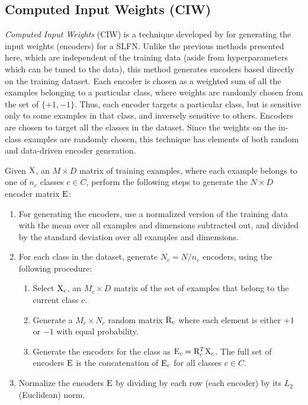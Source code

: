 \subsection{Computed Input Weights (CIW)}

\emph{Computed Input Weights} (CIW) is a technique developed by \textcite{Tapson2015}
for generating the input weights (encoders) for a SLFN.
Unlike the previous methods presented here,
which are independent of the training data
(aside from hyperparameters which can be tuned to the data),
this method generates encoders based directly on the training dataset.
Each encoder is chosen as a weighted sum of all the examples
belonging to a particular class,
where weights are randomly chosen from the set of $\{+1, -1\}$.
Thus, each encoder targets a particular class,
but is sensitive only to some examples in that class,
and inversely sensitive to others.
Encoders are chosen to target all the classes in the dataset.
Since the weights on the in-class examples are randomly chosen,
this technique has elements of both random and data-driven encoder generation.

Given $\mathrm{X}$, an $M \times D$ matrix of training examples,
where each example belongs to one of $n_c$ classes $c \in C$,
perform the following steps to generate the $N \times D$ encoder matrix $\mathrm{E}$:
\begin{enumerate}
  \item For generating the encoders,
    use a normalized version of the training data
    with the mean over all examples and dimensions subtracted out,
    and divided by the standard deviation over all examples and dimensions.
  \item For each class in the dataset, generate $N_c = N / n_c$ encoders,
    using the following procedure:
    \begin{enumerate}
      \item Select $\mathrm{X}_c$, an $M_c \times D$ matrix of the set of examples
        that belong to the current class $c$.
      \item Generate a $M_c \times N_c$ random matrix $\mathrm{R}_c$
        where each element is either $+1$ or $-1$ with equal probability.
      \item Generate the encoders for the class as $\mathrm{E}_c = \mathrm{R}_c^T \mathrm{X}_c$.
        The full set of encoders $\mathrm{E}$ is the concatenation of $\mathrm{E}_c$
        for all classes $c \in C$.
    \end{enumerate}
  \item Normalize the encoders $\mathrm{E}$ by dividing by each row (each encoder)
    by its $L_2$ (Euclidean) norm.
\end{enumerate}


